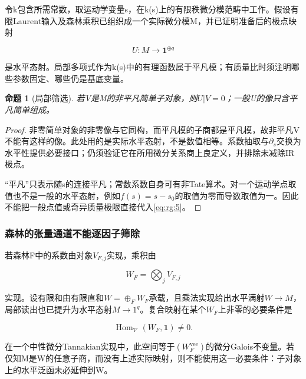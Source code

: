 \documentclass[11pt,a4paper,oneside]{ctexart}
\theoremstyle{cnplain}
\newtheorem{proposition}[theorem]{命题}
\theoremstyle{definition}
\theoremstyle{remark}
\numberwithin{equation}{section}
\begin{document}
令k包含所需常数，取运动学变量s，在k(s)上的有限秩微分模范畴中工作。假设有限Laurent输入及森林乘积已组织成一个实际微分模M，并已证明准备后的极点映射

\begin{equation}
U:M\longrightarrow\mathbf1^{\oplus q}             \label{eq:rg:5}
\end{equation}

是水平态射。局部多项式作为k(s)中的有理函数属于平凡模；有质量比时须注明哪些参数固定、哪些仍是基底变量。

\begin{proposition}[局部筛选]

\label{thm:rg:3.1} 若V是M的非平凡简单子对象，则\(U|V=0\)；一般U的像只含平凡简单组成。

\end{proposition}

\begin{proof}

非零简单对象的非零像与它同构，而平凡模的子商都是平凡模，故非平凡V不能有这样的像。此处用的是实际水平态射，不是数值相等。系数抽取与\(\partial _s\)交换为水平性提供必要接口；仍须验证它在所用微分关系商上良定义，并排除未减除IR极点。

``平凡''只表示随s的连接平凡；常数系数自身可有非Tate算术。对一个运动学点取值也不是一般的水平态射，例如\(f(s)=s-s_0\)的取值为零而导数取值为一。因此不能把一般点值或奇异质量极限直接代入\eqref{eq:rg:5}。

\end{proof}

\subsubsection{森林的张量通道不能逐因子筛除}\label{sec:rg:3.2}

若森林F中的系数由对象\(V_{F,j}\)实现，乘积由

\begin{equation}
W_F=\bigotimes_j V_{F,j}
\end{equation}

实现。设有限和由有限直和\(W=\oplus _F W_F\)承载，且乘法实现给出水平满射\(W\to M\)，局部读出也已提升为水平态射\(M\to 1^q\)。复合映射在某个\(W_F\)上非零的必要条件是

\begin{equation}
\operatorname{Hom}_{\nabla}(W_F,\mathbf1)\ne0.     \label{eq:rg:6}
\end{equation}

在一个中性微分Tannakian实现中，此空间等于\((W_F^{\mathrm{vee}})\)的微分Galois不变量。若仅知M是W的任意子商，而没有上述实际映射，则不能使用这一必要条件：子对象上的水平泛函未必延伸到W。
\end{document}
